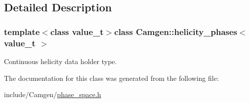 \subsection{Detailed Description}
\subsubsection*{template$<$class value\-\_\-t$>$class Camgen\-::helicity\-\_\-phases$<$ value\-\_\-t $>$}

Continuous helicity data holder type. 

The documentation for this class was generated from the following file\-:\begin{DoxyCompactItemize}
\item 
include/\-Camgen/\hyperlink{a00694}{phase\-\_\-space.\-h}\end{DoxyCompactItemize}
